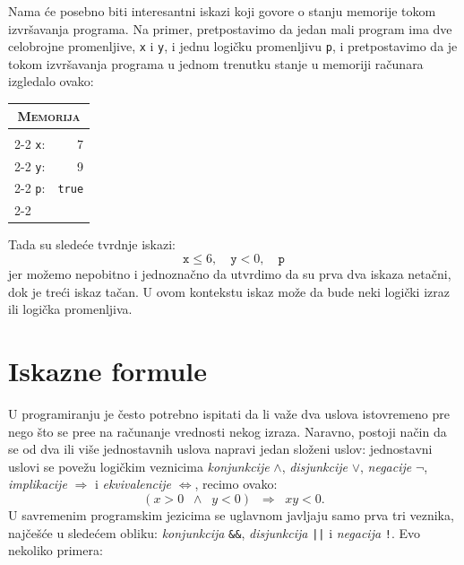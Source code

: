   \hspace*{1.5em}Nama \'ce posebno biti interesantni iskazi koji govore o stanju memorije tokom izvr\v savanja programa.
  Na primer, pretpostavimo da jedan mali program ima dve celobrojne promenljive, \verb`x` i \verb`y`, i jednu logi\v cku promenljivu \verb`p`,
  i pretpostavimo da je tokom izvr\v savanja programa u jednom trenutku stanje u memoriji ra\v cunara izgledalo ovako:
  \begin{center}
  \begin{tabular}{|lr|}
    \multicolumn{2}{c}{\textsc{Memorija}}\\
    \hline
    \multicolumn{2}{|c|}{ }\\
    \cline{2-2}
    \verb`x`: & \multicolumn{1}{|r|}{7}\\
    \cline{2-2}
    \verb`y`: & \multicolumn{1}{|r|}{9}\\
    \cline{2-2}
    \verb`p`: & \multicolumn{1}{|r|}{\texttt{true}}\\
    \cline{2-2}
    \multicolumn{2}{|c|}{ }\\
    \hline
  \end{tabular}
  \end{center}
  Tada su slede\'ce tvrdnje iskazi:
  $$
    \mathtt{x} \le 6, \quad \mathtt{y} < 0, \quad \mathtt{p}
  $$
jer mo\v zemo nepobitno i jednozna\v cno da utvrdimo da su prva dva iskaza neta\v cni, dok je tre\'ci iskaz ta\v can.
U ovom kontekstu iskaz mo\v ze da bude neki logi\v cki izraz ili logi\v cka promenljiva.

\clearpage

\section{Iskazne formule}

U programiranju je \v cesto potrebno ispitati da li va\v ze dva uslova istovremeno pre nego \v sto se pre\dj e na
ra\v cunanje vrednosti nekog izraza. Naravno, postoji na\v cin da se od dva ili vi\v se
jednostavnih uslova napravi jedan slo\v zeni uslov: jednostavni uslovi
se pove\v zu logi\v ckim veznicima \emph{konjunkcije} $\land$,
\emph{disjunkcije} $\lor$, \emph{negacije} $\lnot$, \emph{implikacije} $\Rightarrow$ i \emph{ekvivalencije} $\Leftrightarrow$, recimo
ovako:
$$
  (x > 0 \;\;\land\;\; y < 0) \;\;\Rightarrow\;\; xy < 0.
$$
U savremenim programskim jezicima se uglavnom javljaju samo prva tri veznika, naj\v ce\v s\'ce u slede\'cem obliku:
\emph{konjunkcija} \verb"&&", \emph{disjunkcija} \verb"||" i \emph{negacija} \verb"!".
Evo nekoliko primera:

